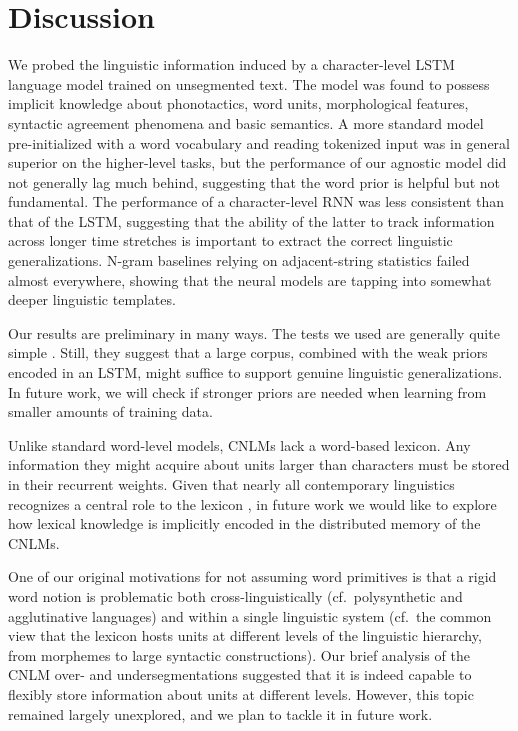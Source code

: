 \section{Discussion}
\label{sec:discussion}

We probed the linguistic information induced by a character-level LSTM
language model trained on unsegmented text. The model was found to
possess implicit knowledge about phonotactics, word units,
morphological features, syntactic agreement phenomena and basic
semantics. A more standard model pre-initialized with a word
vocabulary and reading tokenized input was in general superior on the
higher-level tasks, but the performance of our agnostic model did not
generally lag much behind, suggesting that the word prior is helpful
but not fundamental. The performance of a character-level RNN was less
consistent than that of the LSTM, suggesting that the ability of the
latter to track information across longer time stretches is important
to extract the correct linguistic generalizations. N-gram baselines
relying on adjacent-string statistics failed almost everywhere,
showing that the neural models are tapping into somewhat deeper
linguistic templates.

Our results are preliminary in many ways. The tests we used are
generally quite simple \cite[we did not attempt, for example, to model
long-distance agreement in presence of distractors, a
challenging task even for word-based models and
humans:][]{Gulordava:etal:2018}. Still, they  suggest that a large
corpus, combined with the weak priors encoded in an LSTM, might
suffice to support genuine linguistic generalizations. In future work,
we will check if stronger priors are needed when learning
from smaller amounts of training data.

Unlike standard word-level models, CNLMs lack a word-based
lexicon. Any information they might acquire about units larger than
characters must be stored in their recurrent weights. Given that
nearly all contemporary linguistics recognizes a central role to the
lexicon \cite[see,
e.g.,][]{Sag:etal:2003,Goldberg:2005,Radford:2006,Bresnan:etal:2016,Jezek:2016},
in future work we would like to explore how lexical knowledge is
implicitly encoded in the distributed memory of the CNLMs.

One of our original motivations for not assuming word primitives is that a rigid word notion is problematic both cross-linguistically (cf.~polysynthetic and agglutinative languages) and within a single linguistic system (cf.~the common  view  that the lexicon hosts units at different levels of the linguistic hierarchy, from  morphemes to large syntactic constructions). Our brief analysis of the CNLM over- and undersegmentations suggested that it is indeed capable to flexibly store information about units at different levels. However, this topic  remained largely unexplored, and we plan to tackle it in future work.

